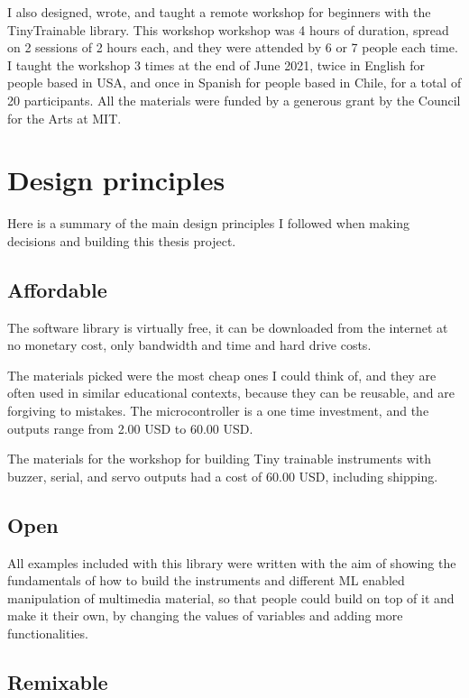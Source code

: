 I also designed, wrote, and taught a remote workshop for beginners with the TinyTrainable library. This workshop workshop was 4 hours of duration, spread on 2 sessions of 2 hours each, and they were attended by 6 or 7 people each time. I taught the workshop 3 times at the end of June 2021, twice in English for people based in USA, and once in Spanish for people based in Chile, for a total of 20 participants. All the materials were funded by a generous grant by the Council for the Arts at MIT.

\section{Design principles}

Here is a summary of the main design principles I followed when making decisions and building this thesis project.

\subsection{Affordable}

The software library is virtually free, it can be downloaded from the internet at no monetary cost, only bandwidth and time and hard drive costs.

The materials picked were the most cheap ones I could think of, and they are often used in similar educational contexts, because they can be reusable, and are forgiving to mistakes. The microcontroller is a one time investment, and the outputs range from 2.00 USD to 60.00 USD. 

The materials for the workshop for building Tiny trainable instruments with buzzer, serial, and servo outputs had a cost of 60.00 USD, including shipping.

\subsection{Open}

All examples included with this library were written with the aim of showing the fundamentals of how to build the instruments and different \acrshort{ML} enabled manipulation of multimedia material, so that people could build on top of it and make it their own, by changing the values of variables and adding more functionalities.

\subsection{Remixable}


